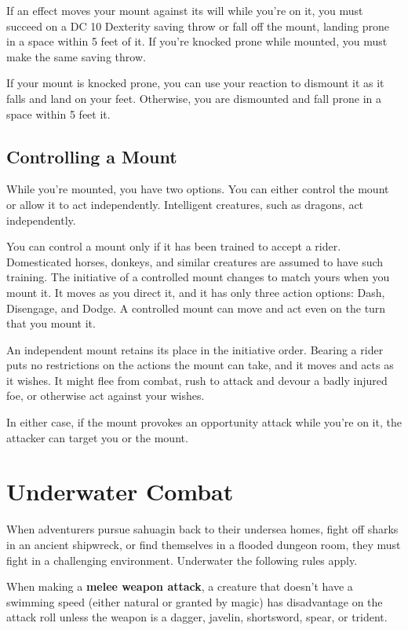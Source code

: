 If an effect moves your mount against its will while you're on it, you must succeed on a DC 10 Dexterity saving throw or fall off the mount, landing prone in a space within 5 feet of it. If you're knocked prone while mounted, you must make the same saving throw.

If your mount is knocked prone, you can use your reaction to dismount it as it falls and land on your feet. Otherwise, you are dismounted and fall prone in a space within 5 feet it.

\subsection{Controlling a Mount}

While you're mounted, you have two options. You can either control the mount or allow it to act independently. Intelligent creatures, such as dragons, act independently.

You can control a mount only if it has been trained to accept a rider. Domesticated horses, donkeys, and similar creatures are assumed to have such training. The initiative of a controlled mount changes to match yours when you mount it. It moves as you direct it, and it has only three action options: Dash, Disengage, and Dodge. A controlled mount can move and act even on the turn that you mount it.

An independent mount retains its place in the initiative order. Bearing a rider puts no restrictions on the actions the mount can take, and it moves and acts as it wishes. It might flee from combat, rush to attack and devour a badly injured foe, or otherwise act against your wishes.

In either case, if the mount provokes an opportunity attack while you're on it, the attacker can target you or the mount.

\section{Underwater Combat}

When adventurers pursue sahuagin back to their undersea homes, fight off sharks in an ancient shipwreck, or find themselves in a flooded dungeon room, they must fight in a challenging environment. Underwater the following rules apply.

When making a \textbf{melee weapon attack}, a creature that doesn't have a swimming speed (either natural or granted by magic) has disadvantage on the attack roll unless the weapon is a dagger, javelin, shortsword, spear, or trident.

